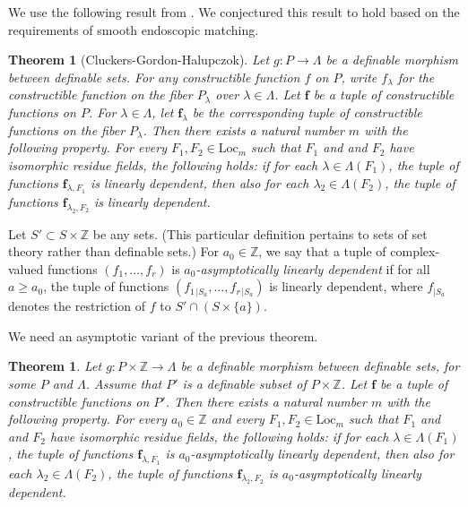 \documentclass[12pt]{amsart}
\newcommand{\ring}[1]{{\mathbb #1}}
\def\bf{\mathbf f}
\newcommand{\Loc}{\mathrm{Loc}}
\theoremstyle{plain}
\newtheorem{theorem}[thm]{Theorem}
\theoremstyle{definition}
\begin{document}
We use the following result from \cite{CGH2}.  We conjectured
this result to hold based on the 
requirements of smooth endoscopic matching.

\begin{theorem}[Cluckers-Gordon-Halupczok]\label{thm:cgh}
  Let $g:P\to \Lambda$ be a definable morphism between definable sets.
  For any constructible function $f$ on $P$, write $f_{\lambda}$ for
  the constructible function on the fiber $P_\lambda$ over $\lambda\in
  \Lambda$.  Let $\bf$ be a tuple of constructible functions on
  $P$. For $\lambda\in \Lambda$, let $\bf_\lambda$ be the
  corresponding tuple of constructible functions on the fiber
  $P_\lambda$.  Then there exists a natural number $m$ with the
  following property.  For every $F_1,F_2 \in \Loc_{m}$ such that
  $F_1$ and and $F_2$ have isomorphic residue fields, the following
  holds: if for each $\lambda\in \Lambda({F_1})$, the tuple of
  functions $\bf_{\lambda,F_1}$ is linearly dependent, then also
  for each $\lambda_2\in \Lambda({F_2})$, the tuple of functions
  $\bf_{\lambda_2,F_2}$ is linearly dependent.
\end{theorem}

Let $S' \subset S\times\ring{Z}$ be any sets.  (This particular
definition pertains to sets of set theory rather than definable sets.)
For $a_0\in\ring{Z}$, we say that a tuple of complex-valued functions
$(f_1,\ldots,f_r)$ is {\it $a_0$-asymptotically linearly dependent} if
for all $a\ge a_0$, the tuple of functions
$(f_{1\,|S_a},\ldots,f_{r\,|S_a})$ is linearly dependent, where
$f_{|S_a}$ denotes the restriction of $f$ to $S'\cap (S\times\{a\})$.

We need an asymptotic variant of the previous theorem.


\begin{theorem}\label{thm:cgh-asymp}
  Let $g:P\times\ring{Z}\to \Lambda$ be a definable morphism between
  definable sets, for some $P$ and $\Lambda$.  Assume that $P'$ is a
  definable subset of $P\times\ring{Z}$.  Let $\bf$ be a tuple of
  constructible functions on $P'$.  Then there exists a natural number
  $m$ with the following property.  For every $a_0\in\ring{Z}$ and
  every $F_1,F_2 \in \Loc_{m}$ such that $F_1$ and and $F_2$ have
  isomorphic residue fields, the following holds: if for each
  $\lambda\in \Lambda({F_1})$, the tuple of functions
  $\bf_{\lambda,F_1}$ is $a_0$-asymptotically linearly dependent, 
  then also for each $\lambda_2\in \Lambda({F_2})$, the tuple of
  functions $\bf_{\lambda_2,F_2}$ is $a_0$-asymptotically linearly
  dependent.
\end{theorem}
\end{document}
